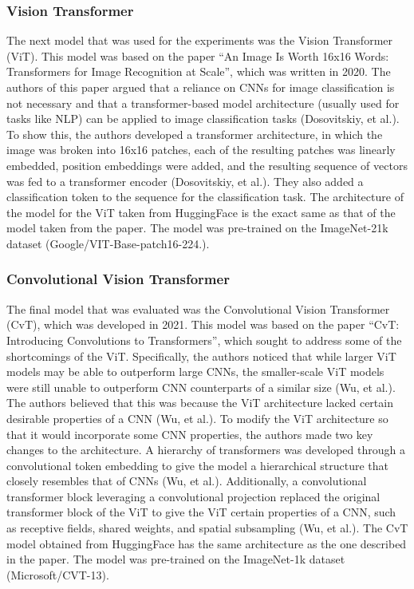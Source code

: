 \documentclass{article}
\begin{document}
\subsubsection*{Vision Transformer}

The next model that was used for the experiments was the Vision Transformer (ViT). This model was based on the paper “An Image Is Worth 16x16 Words: Transformers for Image Recognition at Scale”,  which was written in 2020. The authors of this paper argued that a reliance on CNNs for image classification is not necessary and that a transformer-based model architecture (usually used for tasks like NLP) can be applied to image classification tasks (Dosovitskiy, et al.). To show this, the authors developed a transformer architecture, in which the image was broken into 16x16 patches, each of the resulting patches was linearly embedded, position embeddings were added, and the resulting sequence of vectors was fed to a transformer encoder (Dosovitskiy, et al.). They also added a classification token to the sequence for the classification task. The architecture of the model for the ViT taken from HuggingFace is the exact same as that of the model taken from the paper. The model was pre-trained on the ImageNet-21k dataset (Google/VIT-Base-patch16-224.).

\subsubsection*{Convolutional Vision Transformer}


The final model that was evaluated was the Convolutional Vision Transformer (CvT), which was developed in 2021. This model was based on the paper “CvT: Introducing Convolutions to Transformers”, which sought to address some of the shortcomings of the ViT. Specifically, the authors noticed that while larger ViT models may be able to outperform large CNNs, the smaller-scale ViT models were still unable to outperform CNN counterparts of a similar size (Wu, et al.). The authors believed that this was because the ViT architecture lacked certain desirable properties of a CNN (Wu, et al.). To modify the ViT architecture so that it would incorporate some CNN properties, the authors made two key changes to the architecture. A hierarchy of transformers was developed through a convolutional token embedding to give the model a hierarchical structure that closely resembles that of CNNs (Wu, et al.). Additionally, a convolutional transformer block leveraging a convolutional projection replaced the original transformer block of the ViT to give the ViT certain properties of a CNN, such as receptive fields, shared weights, and spatial subsampling (Wu, et al.). The CvT model obtained from HuggingFace has the same architecture as the one described in the paper. The model was pre-trained on the ImageNet-1k dataset (Microsoft/CVT-13).
\end{document}

